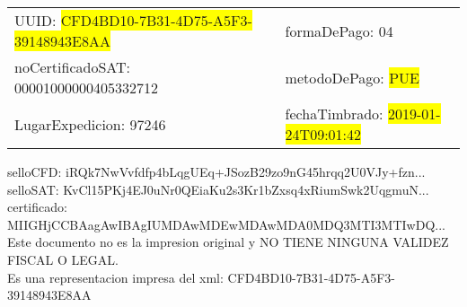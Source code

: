 \documentclass{article}
\begin{document}
\begin{tabular}{p{11cm}p{1cm}p{8cm}}
\bigskip
UUID: \colorbox{yellow}{ CFD4BD10-7B31-4D75-A5F3-39148943E8AA } & & formaDePago: 04\\

noCertificadoSAT: 00001000000405332712 & & metodoDePago: \colorbox{yellow}{ PUE }\\

LugarExpedicion: 97246 & & fechaTimbrado: \colorbox{yellow}{ 2019-01-24T09:01:42 } \\
\end{tabular}

\bigskip
selloCFD: iRQk7NwVvfdfp4bLqgUEq+JSozB29zo9nG45hrqq2U0VJy+fzn... \\
selloSAT: KvCl15PKj4EJ0uNr0QEiaKu2s3Kr1bZxsq4xRiumSwk2UqgmuN... \\

certificado: MIIGHjCCBAagAwIBAgIUMDAwMDEwMDAwMDA0MDQ3MTI3MTIwDQ...\bigskip\bigskip\bigskip\bigskip\bigskip\bigskip
\\Este documento no es la impresion original y NO TIENE NINGUNA VALIDEZ FISCAL O LEGAL. \\
 Es una representacion impresa del xml:  CFD4BD10-7B31-4D75-A5F3-39148943E8AA \\
\end{document}
